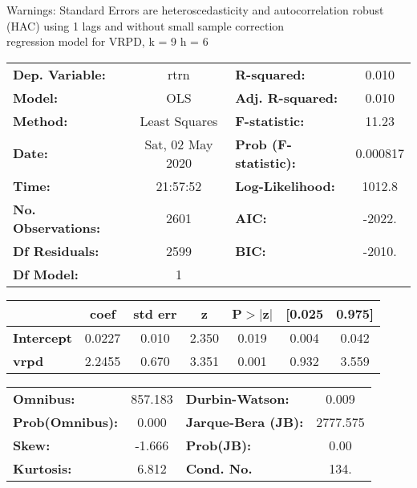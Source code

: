 Warnings: \newline
 [1] Standard Errors are heteroscedasticity and autocorrelation robust (HAC) using 1 lags and without small sample correction\\ 

regression model for VRPD, k = 9 h = 6\begin{center}
\begin{tabular}{lclc}
\toprule
\textbf{Dep. Variable:}    &       rtrn       & \textbf{  R-squared:         } &     0.010   \\
\textbf{Model:}            &       OLS        & \textbf{  Adj. R-squared:    } &     0.010   \\
\textbf{Method:}           &  Least Squares   & \textbf{  F-statistic:       } &     11.23   \\
\textbf{Date:}             & Sat, 02 May 2020 & \textbf{  Prob (F-statistic):} &  0.000817   \\
\textbf{Time:}             &     21:57:52     & \textbf{  Log-Likelihood:    } &    1012.8   \\
\textbf{No. Observations:} &        2601      & \textbf{  AIC:               } &    -2022.   \\
\textbf{Df Residuals:}     &        2599      & \textbf{  BIC:               } &    -2010.   \\
\textbf{Df Model:}         &           1      & \textbf{                     } &             \\
\bottomrule
\end{tabular}
\begin{tabular}{lcccccc}
                   & \textbf{coef} & \textbf{std err} & \textbf{z} & \textbf{P$> |$z$|$} & \textbf{[0.025} & \textbf{0.975]}  \\
\midrule
\textbf{Intercept} &       0.0227  &        0.010     &     2.350  &         0.019        &        0.004    &        0.042     \\
\textbf{vrpd}      &       2.2455  &        0.670     &     3.351  &         0.001        &        0.932    &        3.559     \\
\bottomrule
\end{tabular}
\begin{tabular}{lclc}
\textbf{Omnibus:}       & 857.183 & \textbf{  Durbin-Watson:     } &    0.009  \\
\textbf{Prob(Omnibus):} &   0.000 & \textbf{  Jarque-Bera (JB):  } & 2777.575  \\
\textbf{Skew:}          &  -1.666 & \textbf{  Prob(JB):          } &     0.00  \\
\textbf{Kurtosis:}      &   6.812 & \textbf{  Cond. No.          } &     134.  \\
\bottomrule
\end{tabular}
\end{center}

